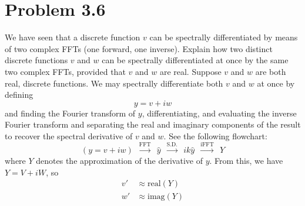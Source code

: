 \documentclass{article}
\begin{document}
\section*{Problem 3.6}
We have seen that a discrete function $v$ can be spectrally differentiated by means of two complex FFTs (one forward, one inverse). Explain how two distinct discrete functions $v$ and $w$ can be spectrally differentiated at once by the same two complex FFTs, provided that $v$ and $w$ are real.
\newline\newline
Suppose $v$ and $w$ are both real, discrete functions. We may spectrally differentiate both $v$ and $w$ at once by defining 
\[y  = v + iw\]
and finding the Fourier transform of $y$, differentiating, and evaluating the inverse Fourier transform and separating the real and imaginary components of the result to recover the spectral derivative of $v$ and $w$. See the following flowchart:
\[(y = v + iw) \:\: \xrightarrow{\text{FFT}} \:\: \hat{y} \:\: \xrightarrow{\text{S.D.}} \:\: ik\hat{y} \:\: \xrightarrow{\text{iFFT}} \:\: Y\]
where $Y$ denotes the approximation of the derivative of $y$. From this, we have $Y = V + iW$, so 
\begin{align*}
    v' &\approx \text{real}(Y) \\
    w' &\approx \text{imag}(Y) \\
\end{align*}
\end{document}

